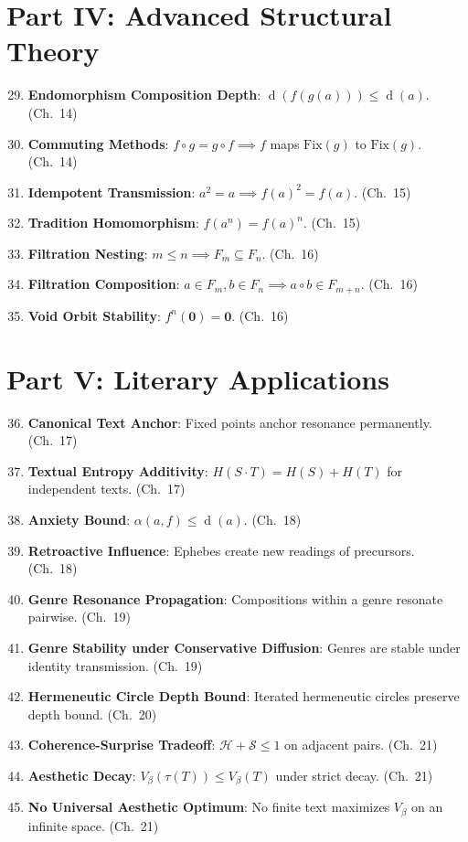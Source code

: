 \documentclass[11pt,openany]{book}
\theoremstyle{definition}
\theoremstyle{plain}
\theoremstyle{remark}
\newcommand{\compose}{\circ}                 %
\newcommand{\void}{\mathbf{0}}              %
\newcommand{\depth}{\operatorname{d}}       %
\newcommand{\transmit}{\tau}                 %
\begin{document}
\section{Part IV: Advanced Structural Theory}

\begin{enumerate}
\setcounter{enumi}{28}
\item \textbf{Endomorphism Composition Depth}: $\depth(f(g(a))) \leq \depth(a)$. (Ch.~14)
\item \textbf{Commuting Methods}: $f \circ g = g \circ f \implies f$ maps $\mathrm{Fix}(g)$ to $\mathrm{Fix}(g)$. (Ch.~14)
\item \textbf{Idempotent Transmission}: $a^2 = a \implies f(a)^2 = f(a)$. (Ch.~15)
\item \textbf{Tradition Homomorphism}: $f(a^n) = f(a)^n$. (Ch.~15)
\item \textbf{Filtration Nesting}: $m \leq n \implies F_m \subseteq F_n$. (Ch.~16)
\item \textbf{Filtration Composition}: $a \in F_m, b \in F_n \implies a \compose b \in F_{m+n}$. (Ch.~16)
\item \textbf{Void Orbit Stability}: $f^n(\void) = \void$. (Ch.~16)
\end{enumerate}

\section{Part V: Literary Applications}

\begin{enumerate}
\setcounter{enumi}{35}
\item \textbf{Canonical Text Anchor}: Fixed points anchor resonance permanently. (Ch.~17)
\item \textbf{Textual Entropy Additivity}: $H(S \cdot T) = H(S) + H(T)$ for independent texts. (Ch.~17)
\item \textbf{Anxiety Bound}: $\alpha(a, f) \leq \depth(a)$. (Ch.~18)
\item \textbf{Retroactive Influence}: Ephebes create new readings of precursors. (Ch.~18)
\item \textbf{Genre Resonance Propagation}: Compositions within a genre resonate pairwise. (Ch.~19)
\item \textbf{Genre Stability under Conservative Diffusion}: Genres are stable under identity transmission. (Ch.~19)
\item \textbf{Hermeneutic Circle Depth Bound}: Iterated hermeneutic circles preserve depth bound. (Ch.~20)
\item \textbf{Coherence-Surprise Tradeoff}: $\mathcal{H} + \mathcal{S} \leq 1$ on adjacent pairs. (Ch.~21)
\item \textbf{Aesthetic Decay}: $V_\beta(\transmit(T)) \leq V_\beta(T)$ under strict decay. (Ch.~21)
\item \textbf{No Universal Aesthetic Optimum}: No finite text maximizes $V_\beta$ on an infinite space. (Ch.~21)
\end{enumerate}
\end{document}
